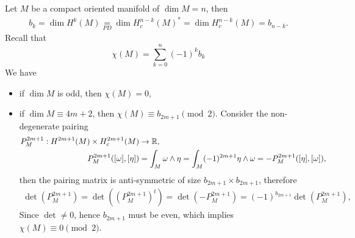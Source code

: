 \begin{example}
    Let \(M\) be a compact oriented manifold of \(\dim M = n\), then \begin{align*}
        b_k = \dim H^k(M) \underset{PD}{=} \dim H_c^{n-k}(M)^* = \dim H_c^{n-k}(M) = b_{n-k}.
    \end{align*}
    Recall that \[
        \chi(M) = \sum_{k=0}^n (-1)^k b_k
    \]
    We have \begin{itemize}
        \item if \(\dim M\) is odd, then \(\chi(M) = 0\),
        \item if \(\dim M \equiv 4m + 2\), then \(\chi(M) \equiv b_{2m+1}\pmod{2}\). Consider the non-degenerate pairing \begin{align*}
            P_M^{2m+1}: H^{2m+1}(M)\times H_c^{2m+1}(M) &\rightarrow \mathbb{R}, \\
            P_M^{2m+1}([\omega],[\eta]) &= \int_M \omega\wedge\eta = \int_M (-1)^{2m+1} \eta\wedge\omega = -P_M^{2m+1}([\eta],[\omega]),
        \end{align*} then the pairing matrix is anti-symmetric of size \(b_{2m+1}\times b_{2m+1}\), therefore \begin{align*}
            \det(P_M^{2m+1}) = \det((P_M^{2m+1})^t) = \det(-P_M^{2m+1}) = (-1)^{b_{2m+1}}\det(P_M^{2m+1}),
        \end{align*}
        Since \(\det\neq 0\), hence \(b_{2m+1}\) must be even, which implies \(\chi(M)\equiv 0\pmod{2}\).
    \end{itemize}
\end{example}

